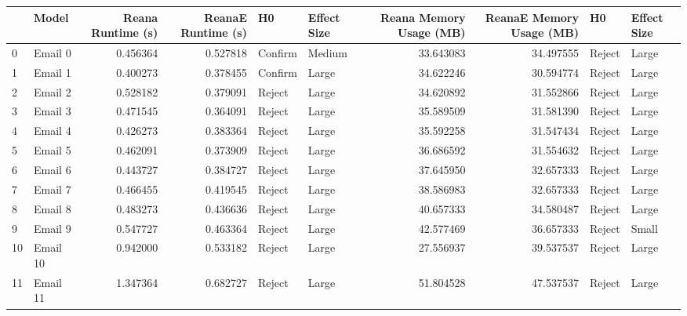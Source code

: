 \begin{tabular}{llrrllrrll}
\toprule
{} &     Model &  Reana Runtime (s) &  ReanaE Runtime (s) &       H0 & Effect Size &  Reana Memory Usage (MB) &  ReanaE Memory Usage (MB) &      H0 & Effect Size \\
\midrule
0  &   Email 0 &           0.456364 &            0.527818 &  Confirm &      Medium &                33.643083 &                 34.497555 &  Reject &       Large \\
1  &   Email 1 &           0.400273 &            0.378455 &  Confirm &       Large &                34.622246 &                 30.594774 &  Reject &       Large \\
2  &   Email 2 &           0.528182 &            0.379091 &   Reject &       Large &                34.620892 &                 31.552866 &  Reject &       Large \\
3  &   Email 3 &           0.471545 &            0.364091 &   Reject &       Large &                35.589509 &                 31.581390 &  Reject &       Large \\
4  &   Email 4 &           0.426273 &            0.383364 &   Reject &       Large &                35.592258 &                 31.547434 &  Reject &       Large \\
5  &   Email 5 &           0.462091 &            0.373909 &   Reject &       Large &                36.686592 &                 31.554632 &  Reject &       Large \\
6  &   Email 6 &           0.443727 &            0.384727 &   Reject &       Large &                37.645950 &                 32.657333 &  Reject &       Large \\
7  &   Email 7 &           0.466455 &            0.419545 &   Reject &       Large &                38.586983 &                 32.657333 &  Reject &       Large \\
8  &   Email 8 &           0.483273 &            0.436636 &   Reject &       Large &                40.657333 &                 34.580487 &  Reject &       Large \\
9  &   Email 9 &           0.547727 &            0.463364 &   Reject &       Large &                42.577469 &                 36.657333 &  Reject &       Small \\
10 &  Email 10 &           0.942000 &            0.533182 &   Reject &       Large &                27.556937 &                 39.537537 &  Reject &       Large \\
11 &  Email 11 &           1.347364 &            0.682727 &   Reject &       Large &                51.804528 &                 47.537537 &  Reject &       Large \\

\end{tabular}
